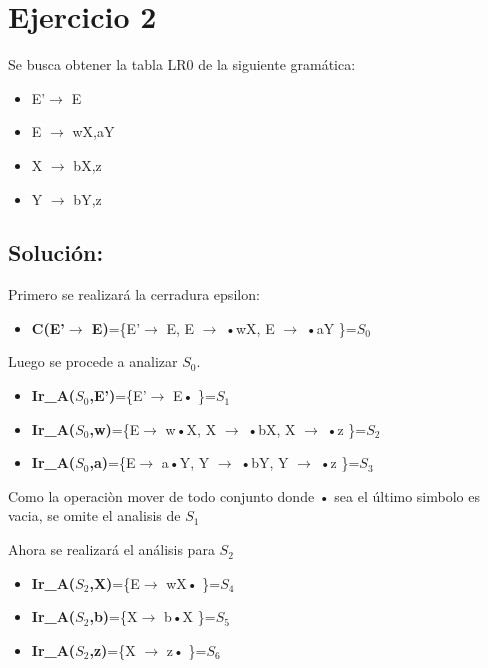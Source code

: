 \documentclass[11pt,a4paper]{article}
\begin{document}
\section{Ejercicio 2}
Se busca obtener la tabla LR0 de la siguiente gramática:

\begin{itemize}
\item E'$\longrightarrow$ E
\item E $\longrightarrow$ wX,aY
\item X $\longrightarrow$ bX,z
\item Y $\longrightarrow$ bY,z

\end{itemize}

\subsection{Solución:}
Primero se realizará la cerradura epsilon:
\begin{itemize}
\item \textbf{C(E'$\longrightarrow$ E)}=\{E'$\longrightarrow$ E, E $\longrightarrow$ •wX,  E $\longrightarrow$ •aY \}=\textit{$S_{0}$} 
\end{itemize}


Luego se procede a analizar $S_{0}$.
\begin{itemize}
\item \textbf{Ir\_A($S_{0}$,E')}=\{E'$\longrightarrow$ E• \}=\textit{$S_{1}$} 
\item \textbf{Ir\_A($S_{0}$,w)}=\{E$\longrightarrow$ w•X, X $\longrightarrow$ •bX, X $\longrightarrow$ •z \}=\textit{$S_{2}$} 
\item \textbf{Ir\_A($S_{0}$,a)}=\{E$\longrightarrow$ a•Y, Y $\longrightarrow$ •bY, Y $\longrightarrow$ •z \}=\textit{$S_{3}$}
\end{itemize}


Como la operaciòn mover de todo conjunto donde • sea el último simbolo es vacia, se omite el analisis de $S_{1}$

Ahora se realizará el análisis para $S_{2}$
\begin{itemize}
\item \textbf{Ir\_A($S_{2}$,X)}=\{E$\longrightarrow$ wX• \}=\textit{$S_{4}$} 
\item \textbf{Ir\_A($S_{2}$,b)}=\{X$\longrightarrow$ b•X \}=\textit{$S_{5}$} 
\item \textbf{Ir\_A($S_{2}$,z)}=\{X $\longrightarrow$ z• \}=\textit{$S_{6}$}
\end{itemize}
\end{document}

